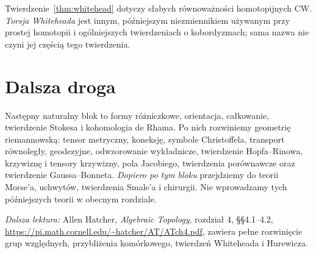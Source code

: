 \begin{uwaga}
Twierdzenie~\ref{thm:whitehead}
dotyczy słabych równoważności
homotopijnych CW.
\emph{Torsja Whiteheada}
jest innym, późniejszym
niezmiennikiem używanym
przy prostej homotopii
i ogólniejszych
twierdzeniach o
kobordyzmach; sama
nazwa nie czyni jej
częścią tego twierdzenia.
\end{uwaga}

\section*{Dalsza droga}
Następny naturalny blok to
formy różniczkowe,
orientacja, całkowanie,
twierdzenie Stokesa
i kohomologia de Rhama.
Po nich rozwiniemy
geometrię riemannowską:
tensor metryczny, koneksję,
symbole Christoffela,
transport równoległy,
geodezyjne, odwzorowanie
wykładnicze, twierdzenie
Hopfa--Rinowa, krzywiznę
i tensory krzywizny,
pola Jacobiego,
twierdzenia porównawcze
oraz twierdzenie
Gaussa--Bonneta.
\emph{Dopiero po tym bloku}
przejdziemy do teorii
Morse'a, uchwytów,
twierdzenia Smale'a
i chirurgii.
Nie wprowadzamy
tych późniejszych
teorii w obecnym rozdziale.

\par\smallskip
{\footnotesize\noindent\emph{Dalsza lektura:}
Allen Hatcher,
\emph{Algebraic Topology},
rozdział 4, §§4.1--4.2,
\url{https://pi.math.cornell.edu/~hatcher/AT/ATch4.pdf},
zawiera pełne rozwinięcie
grup względnych,
przybliżenia komórkowego,
twierdzeń Whiteheada
i Hurewicza.\par}
\clearpage
